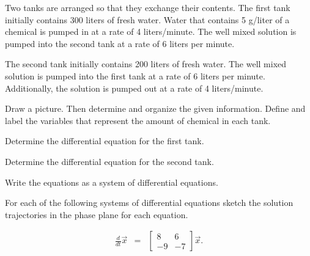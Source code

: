   \begin{problem}

  \item Two tanks are arranged so that they exchange their
    contents. The first tank initially contains 300 liters of fresh
    water. Water that contains 5 g/liter of a chemical is pumped in at
    a rate of 4 liters/minute. The well mixed solution is pumped into
    the second tank at a rate of 6 liters per minute.

    The second tank initially contains 200 liters of fresh water. The
    well mixed solution is pumped into the first tank at a rate of 6
    liters per minute. Additionally, the solution is pumped out at a
    rate of 4 liters/minute.


    \begin{subproblem}
      \item Draw a picture. Then determine and organize the given
        information. Define and label the variables that represent the
        amount of chemical in each tank.
        \vfill

      \item Determine the differential equation for the first tank.
        \vfill

      \item Determine the differential equation for the second tank.
        \vfill

      \item Write the equations as a system of differential equations.
        \vfill

    \end{subproblem}

    \clearpage

  \item For each of the following systems of differential equations
    sketch the solution trajectories in the phase plane for each
    equation.
    
    \begin{subproblem}
      
    \item 
        \begin{eqnarray}
          \frac{d}{dt} \vec{x} & = & 
          \left[ \begin{array}{rr}
               8 &  6 \\
              -9 & -7
            \end{array} \right] \vec{x}.
        \end{eqnarray}


\end{subproblem}
\end{problem}
